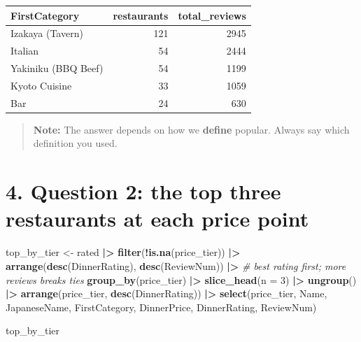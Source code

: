 \documentclass[
]{article}
\newenvironment{Shaded}{\begin{snugshade}}{\end{snugshade}}
\newcommand{\AttributeTok}[1]{\textcolor[rgb]{0.13,0.29,0.53}{#1}}
\newcommand{\CommentTok}[1]{\textcolor[rgb]{0.56,0.35,0.01}{\textit{#1}}}
\newcommand{\DecValTok}[1]{\textcolor[rgb]{0.00,0.00,0.81}{#1}}
\newcommand{\FunctionTok}[1]{\textcolor[rgb]{0.13,0.29,0.53}{\textbf{#1}}}
\newcommand{\NormalTok}[1]{#1}
\newcommand{\OtherTok}[1]{\textcolor[rgb]{0.56,0.35,0.01}{#1}}
\newcommand{\SpecialCharTok}[1]{\textcolor[rgb]{0.81,0.36,0.00}{\textbf{#1}}}
\newcounter{none} %
\begin{document}
{\def\LTcaptype{none} %
\begin{longtable}[]{@{}lrr@{}}
\toprule\noalign{}
FirstCategory & restaurants & total\_reviews \\
\midrule\noalign{}
\endhead
\bottomrule\noalign{}
\endlastfoot
Izakaya (Tavern) & 121 & 2945 \\
Italian & 54 & 2444 \\
Yakiniku (BBQ Beef) & 54 & 1199 \\
Kyoto Cuisine & 33 & 1059 \\
Bar & 24 & 630 \\
\end{longtable}
}

\begin{quote}
\textbf{Note:} The answer depends on how we \textbf{define} popular.
Always say which definition you used.
\end{quote}

\section{4. Question 2: the top three restaurants at each price
point}\label{question-2-the-top-three-restaurants-at-each-price-point}

\begin{Shaded}
\begin{Highlighting}[]
\NormalTok{top\_by\_tier }\OtherTok{\textless{}{-}}\NormalTok{ rated }\SpecialCharTok{|\textgreater{}}
  \FunctionTok{filter}\NormalTok{(}\SpecialCharTok{!}\FunctionTok{is.na}\NormalTok{(price\_tier)) }\SpecialCharTok{|\textgreater{}}
  \FunctionTok{arrange}\NormalTok{(}\FunctionTok{desc}\NormalTok{(DinnerRating), }\FunctionTok{desc}\NormalTok{(ReviewNum)) }\SpecialCharTok{|\textgreater{}}   \CommentTok{\# best rating first; more reviews breaks ties}
  \FunctionTok{group\_by}\NormalTok{(price\_tier) }\SpecialCharTok{|\textgreater{}}
  \FunctionTok{slice\_head}\NormalTok{(}\AttributeTok{n =} \DecValTok{3}\NormalTok{) }\SpecialCharTok{|\textgreater{}}
  \FunctionTok{ungroup}\NormalTok{() }\SpecialCharTok{|\textgreater{}}
  \FunctionTok{arrange}\NormalTok{(price\_tier, }\FunctionTok{desc}\NormalTok{(DinnerRating)) }\SpecialCharTok{|\textgreater{}}
  \FunctionTok{select}\NormalTok{(price\_tier, Name, JapaneseName, FirstCategory,}
\NormalTok{         DinnerPrice, DinnerRating, ReviewNum)}

\NormalTok{top\_by\_tier}
\end{Highlighting}
\end{Shaded}
\end{document}
